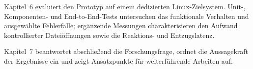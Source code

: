 Kapitel~6 evaluiert den Prototyp auf einem dedizierten Linux-Zielsystem. Unit-, Komponenten- und End-to-End-Tests untersuchen das funktionale Verhalten und ausgewählte Fehlerfälle; ergänzende Messungen charakterisieren den Aufwand kontrollierter Dateiöffnungen sowie die Reaktions- und Entzugslatenz.

Kapitel~7 beantwortet abschließend die Forschungsfrage, ordnet die Aussagekraft der Ergebnisse ein und zeigt Ansatzpunkte für weiterführende Arbeiten auf.

\newpage
